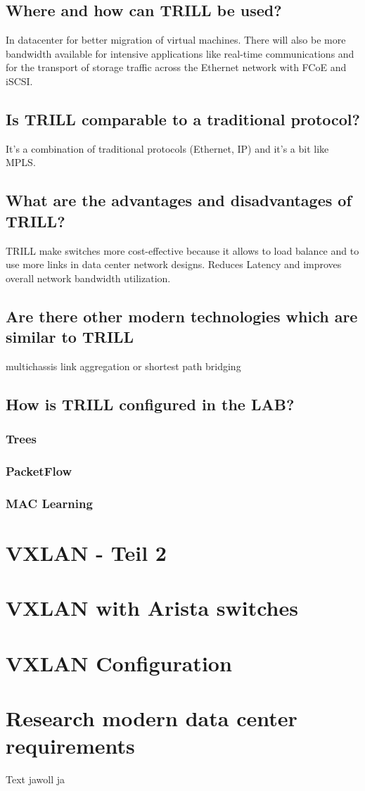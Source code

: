 \documentclass[a4,12pt]{scrartcl}
\begin{document}
\subsection{Where and how can TRILL be used?}
In datacenter for better migration of virtual machines. There will also be more bandwidth available for intensive applications like real-time communications and for the transport of storage traffic across the Ethernet network with FCoE and iSCSI.

\subsection{Is TRILL comparable to a traditional protocol?}It's a combination of traditional protocols (Ethernet, IP) and it's a bit like MPLS.
\subsection{What are the advantages and disadvantages of TRILL?}
TRILL make switches more cost-effective because it allows to load balance and to use more links in data center network designs.
Reduces Latency and improves overall network bandwidth utilization.
\subsection{Are there other modern technologies which are similar to TRILL} multichassis link aggregation or shortest path bridging
\subsection{How is TRILL configured in the LAB?}
\subsubsection{Trees}
\subsubsection{PacketFlow}
\subsubsection{MAC Learning} 
\newpage
\section{VXLAN - Teil 2}
\section{VXLAN with Arista switches}
\section{VXLAN Configuration}
\section{Research modern data center requirements}
Text jawoll ja
\end{document}
